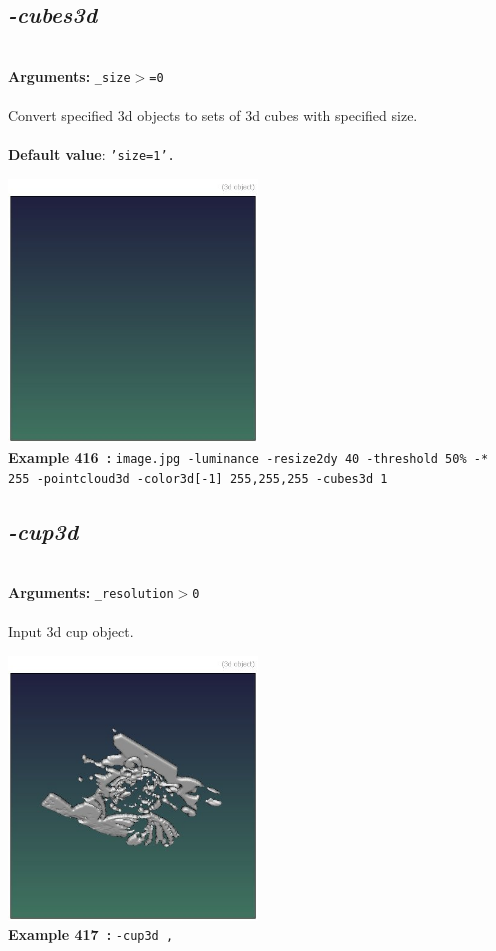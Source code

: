 \documentclass[a4paper,11pt,twoside]{book}
\begin{document}
\subsection{\emph{-cubes3d} }\vspace*{-0.5em}
~\\\textbf{Arguments: } 
{\small \texttt{\_size$>$=0}}\\~\\
Convert specified 3d objects to sets of 3d cubes with specified size.
~\\~\\\textbf{Default value}: {\small \texttt{'size=1'.}}
\begin{center}\includegraphics[keepaspectratio=true,height=7cm,width=\textwidth]{img/gmic_def416.jpg}\\
{\footnotesize \textbf{Example 416~:} \texttt{image.jpg -luminance -resize2dy 40 -threshold 50\% -* 255 -pointcloud3d -color3d[-1] 255,255,255 -cubes3d 1}}
\end{center}

\subsection{\emph{-cup3d} }\vspace*{-0.5em}
~\\\textbf{Arguments: } 
{\small \texttt{\_resolution$>$0}}\\~\\
Input 3d cup object.
\begin{center}\includegraphics[keepaspectratio=true,height=7cm,width=\textwidth]{img/gmic_def417.jpg}\\
{\footnotesize \textbf{Example 417~:} \texttt{-cup3d ,}}
\end{center}
\end{document}
